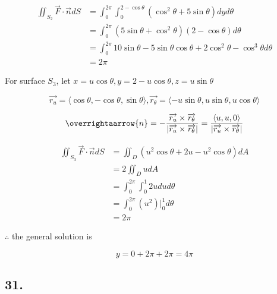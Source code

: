 \documentclass{article}
\begin{document}
  $$\begin{aligned}
    \iint_{S_2} \overrightarrow{F} \cdot \overrightarrow{n} dS &= \int_0^{2\pi} \int_0^{2-\cos \theta} (\cos^2 \theta + 5\sin \theta) dy d\theta  \\
                                                               &= \int_0^{2\pi} (5\sin \theta + \cos^2 \theta)(2- \cos \theta) d\theta \\
                                                               &= \int_0^{2\pi} 10\sin\theta - 5\sin \theta \cos \theta + 2\cos^2 \theta - \cos^3 \theta d\theta \\
                                                               &= 2\pi
  \end{aligned}
  $$

  For surface $S_3$, let $x = u \cos \theta, y = 2 - u \cos \theta, z = u \sin \theta$

  $$\overrightarrow{r_u} = \langle \cos \theta, -\cos \theta, \sin \theta \rangle, \overrightarrow{r_\theta} = \langle -u\sin \theta, u \sin \theta, u \cos \theta \rangle$$

  $$\overrightaarrow{n} = -\frac{\overrightarrow{r_u} \times \overrightarrow{r_\theta}}{|\overrightarrow{r_u} \times \overrightarrow{r_\theta}|} = \frac{\langle u, u, 0 \rangle}{|\overrightarrow{r_u} \times \overrightarrow{r_\theta}|}$$

  $$\begin{aligned}
    \iint_{S_3} \overrightarrow{F} \cdot \overrightarrow{n} dS &= \iint_D (u^2 \cos \theta + 2u - u^2 \cos \theta) dA \\
                                                               &= 2\iint_D u dA \\
                                                               &=  \int_0^{2\pi} \int_0^1 2u du d\theta \\
                                                               &= \int_0^{2\pi} (u^2)\biggl|_0^1 d\theta \\
                                                               &= 2\pi
\end{aligned}$$

$\therefore$ the general solution is

$$y = 0 + 2\pi + 2\pi = 4\pi$$

  \subsection*{31. }
\end{document}

